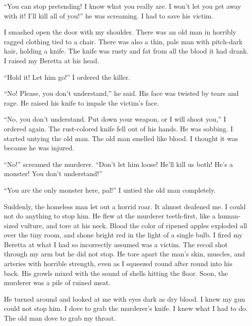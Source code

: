 ``You can stop pretending! I know what you really are. I
won't let you get away with it! I'll kill all of
you!'' he was screaming. I had to save his victim.



I smashed open the door with my shoulder. There was an old man in
horribly ragged clothing tied to a chair. There was also a thin,
pale man with pitch-dark hair, holding a knife. The knife was rusty
and fat from all the blood it had drank. I raised my Beretta at his
head.



``Hold it! Let him go!'' I ordered the killer.



``No! Please, you don't understand,'' he said. His
face was twisted by tears and rage. He raised his knife to impale
the victim's face.



``No, you don't understand. Put down your weapon, or I
will shoot you,'' I ordered again. The rust-colored knife fell
out of his hands. He was sobbing. I started untying the old man.
The old man smelled like blood. I thought it was because he was
injured.



``No!'' screamed the murderer. ``Don't let him
loose! He'll kill us both! He's a monster! You
don't understand!''



``You are the only monster here, pal!'' I untied the old
man completely.



Suddenly, the homeless man let out a horrid roar. It almost
deafened me. I could not do anything to stop him. He flew at the
murderer teeth-first, like a human-sized vulture, and tore at his
neck. Blood the color of ripened apples exploded all over the tiny
room, and shone bright red in the light of a single bulb. I fired
my Beretta at what I had so incorrectly assumed was a victim. The
recoil shot through my arm but he did not stop. He tore apart the
man's skin, muscles, and arteries with horrible strength,
even as I squeezed round after round into his back. His growls
mixed with the sound of shells hitting the floor. Soon, the
murderer was a pile of ruined meat.



He turned around and looked at me with eyes dark as dry blood. I
knew my gun could not stop him. I dove to grab the murderer's
knife. I knew what I had to do. The old man dove to grab my
throat.



